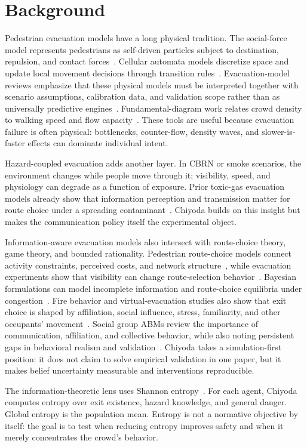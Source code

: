 \section{Background}
\label{sec:background}

Pedestrian evacuation models have a long physical tradition. The social-force
model represents pedestrians as self-driven particles subject to destination,
repulsion, and contact forces~\cite{helbing1995social}. Cellular automata
models discretize space and update local movement decisions through transition
rules~\cite{burstedde2001simulation}. Evacuation-model reviews emphasize that
these physical models must be interpreted together with scenario assumptions,
calibration data, and validation scope rather than as universally predictive
engines~\cite{gwynne1999review,schadschneider2009evacuation}.
Fundamental-diagram work relates crowd density to walking speed and flow
capacity~\cite{fruin1971pedestrian,weidmann1993transporttechnik}.
These tools are useful because evacuation failure is often physical:
bottlenecks, counter-flow, density waves, and slower-is-faster effects can
dominate individual intent.

Hazard-coupled evacuation adds another layer. In CBRN or smoke scenarios, the
environment changes while people move through it; visibility, speed, and
physiology can degrade as a function of exposure. Prior toxic-gas evacuation
models already show that information perception and transmission matter for
route choice under a spreading contaminant~\cite{makmul2020cellular,liu2021toxicgas}.
Chiyoda builds on this insight but makes the communication policy itself the
experimental object.

Information-aware evacuation models also intersect with route-choice theory,
game theory, and bounded rationality. Pedestrian route-choice models connect
activity constraints, perceived costs, and network structure~\cite{hoogendoorn2004routechoice},
while evacuation experiments show that visibility can change route-selection
behavior~\cite{guo2012visibility}. Bayesian formulations can model incomplete information
and route-choice equilibria under congestion~\cite{mah90dynamic,wang2023bayesian}. Fire
behavior and virtual-evacuation studies also show that exit choice is shaped
by affiliation, social influence, stress, familiarity, and other occupants'
movement~\cite{sime1983affiliative,kobes2010building,bode2013human,kinateder2014social}. Social
group ABMs review the importance of communication, affiliation, and collective
behavior, while also noting persistent gaps in behavioral realism and
validation~\cite{templeton2023social,senanayake2024agent}. Chiyoda takes a
simulation-first position: it does not claim to solve empirical validation in
one paper, but it makes belief uncertainty measurable and interventions
reproducible.

The information-theoretic lens uses Shannon entropy~\cite{shannon1948mathematical}.
For each agent, Chiyoda computes entropy over exit existence, hazard knowledge,
and general danger. Global entropy is the population mean. Entropy is not a
normative objective by itself: the goal is to test when reducing entropy
improves safety and when it merely concentrates the crowd's behavior.
